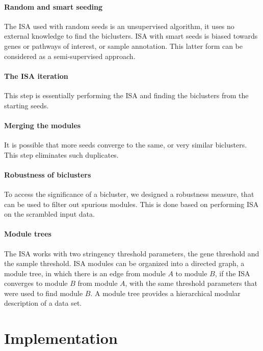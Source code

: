 \documentclass{bioinfo}
\begin{document}
\paragraph{Random and smart seeding}
The ISA used with random seeds is an unsupervised algorithm, it uses no
external knowledge to find the biclusters. ISA with smart seeds is
biased towards genes or pathways of interest, or sample annotation.
This latter form can be considered as a semi-supervised approach.

\paragraph{The ISA iteration}
This step is essentially performing the ISA and finding the biclusters
from the starting seeds.

\paragraph{Merging the modules}
It is possible that more seeds converge to the same, or very similar
biclusters. This step eliminates such duplicates.

\paragraph{Robustness of biclusters}
To access the significance of a bicluster, we designed a robustness
measure, that can be used to filter out spurious modules. This is done
based on performing ISA on the scrambled input data.

\paragraph{Module trees}
The ISA works with two stringency threshold parameters, the gene
threshold and the sample threshold. ISA modules can be organized into
a directed graph, a module tree, in which there is an edge from module
$A$ to module $B$, if the ISA converges to module $B$ from module $A$,
with the same threshold parameters  that were used to find module
$B$. A module tree provides a hierarchical modular description of a
data set.

\section{Implementation}
\end{document}

